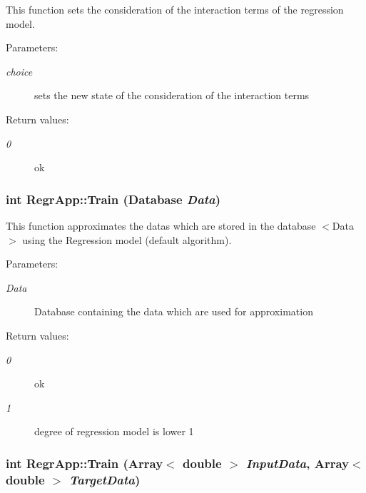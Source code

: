 This function sets the consideration of the interaction terms of the regression model. 

\begin{Desc}
\item[Parameters:]
\begin{description}
\item[{\em choice}]sets the new state of the consideration of the interaction terms \end{description}
\end{Desc}
\begin{Desc}
\item[Return values:]
\begin{description}
\item[{\em 0}]ok \end{description}
\end{Desc}
\subsubsection{\setlength{\rightskip}{0pt plus 5cm}int Regr\-App::Train (Database {\em Data})}\label{classRegrApp_717db1b6823b6c5ac50748097daf7870}


This function approximates the datas which are stored in the database $<$Data$>$ using the Regression model (default algorithm). 

\begin{Desc}
\item[Parameters:]
\begin{description}
\item[{\em Data}]Database containing the data which are used for approximation \end{description}
\end{Desc}
\begin{Desc}
\item[Return values:]
\begin{description}
\item[{\em 0}]ok \item[{\em 1}]degree of regression model is lower 1 \end{description}
\end{Desc}
\subsubsection{\setlength{\rightskip}{0pt plus 5cm}int Regr\-App::Train (Array$<$ double $>$ {\em Input\-Data}, Array$<$ double $>$ {\em Target\-Data})}\label{classRegrApp_3ea864f3bf4457209194a0ec4e82ba6a}


